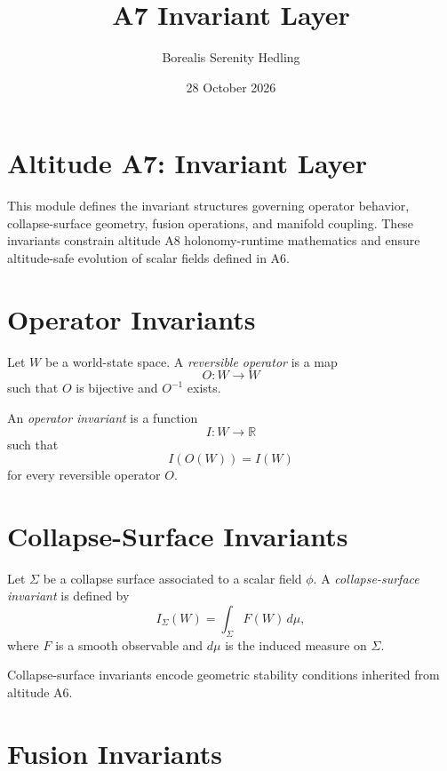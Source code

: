 \documentclass[12pt]{article}
\title{A7 Invariant Layer}
\author{Borealis Serenity Hedling}
\date{28 October 2026}
\begin{document}
\maketitle

\section*{Altitude A7: Invariant Layer}

This module defines the invariant structures governing operator behavior,
collapse-surface geometry, fusion operations, and manifold coupling. These
invariants constrain altitude A8 holonomy-runtime mathematics and ensure
altitude-safe evolution of scalar fields defined in A6.

\section{Operator Invariants}

\begin{definition}
Let $W$ be a world-state space. A \emph{reversible operator} is a map
\[
O : W \to W
\]
such that $O$ is bijective and $O^{-1}$ exists.
\end{definition}

\begin{definition}
An \emph{operator invariant} is a function
\[
I : W \to \mathbb{R}
\]
such that
\[
I(O(W)) = I(W)
\]
for every reversible operator $O$.
\end{definition}

\section{Collapse-Surface Invariants}

\begin{definition}
Let $\Sigma$ be a collapse surface associated to a scalar field $\phi$.
A \emph{collapse-surface invariant} is defined by
\[
I_\Sigma(W) = \int_{\Sigma} F(W) \, d\mu,
\]
where $F$ is a smooth observable and $d\mu$ is the induced measure on $\Sigma$.
\end{definition}

\begin{remark}
Collapse-surface invariants encode geometric stability conditions inherited
from altitude A6.
\end{remark}

\section{Fusion Invariants}
\end{document}

